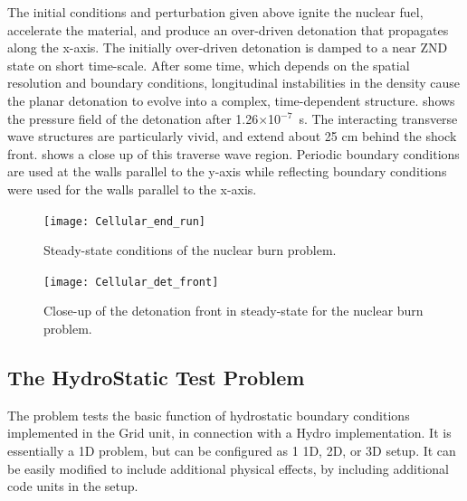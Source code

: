 
The initial conditions and perturbation given above ignite the nuclear
fuel, accelerate the material, and produce an over-driven detonation
that propagates along the x-axis.  The initially over-driven
detonation is damped to a near ZND state on short time-scale.  After
some time, which depends on the spatial resolution and boundary
conditions, longitudinal instabilities in the density cause the planar
detonation to evolve into a complex, time-dependent structure.  shows the pressure field of the detonation after
\hbox{1.26$\times$10$^{-7}$ s}.  The interacting transverse wave
structures are particularly vivid, and extend about 25 cm behind the
shock front.   shows a close up of this traverse
wave region.  Periodic boundary conditions are used at the walls parallel to
the y-axis while reflecting boundary conditions were used for the walls
parallel to the x-axis.

\begin{figure}
\begin{center}
{\leavevmode\texttt{[image: Cellular\_end\_run]}}
\end{center}
\caption{\label{Fig:end_run} Steady-state conditions of the 
nuclear burn problem.}
\end{figure}


\begin{figure}
\begin{center}
{\leavevmode\texttt{[image: Cellular\_det\_front]}}
\end{center}
\caption{\label{Fig:det_front} Close-up of the detonation front in steady-state for
the  nuclear burn problem.}
\end{figure}




\subsection{The HydroStatic Test Problem}
\label{Sec:HydroStatic}
The  problem tests the basic function of
hydrostatic boundary conditions implemented in the
\unit{Grid} unit, in connection with a \unit{Hydro} implementation.
It is essentially a 1D problem, but can
be configured as 1 1D, 2D, or 3D setup.
It can be easily modified to include additional physical effects,
by including additional code units in the setup.

